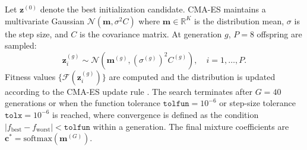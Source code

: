 \documentclass[preprint,12pt]{elsarticle}
\begin{document}
Let $\mathbf{z}^{(0)}$ denote the best initialization candidate. CMA-ES
maintains a multivariate Gaussian $\mathcal{N}(\mathbf{m}, \sigma^2 C)$ where
$\mathbf{m} \in \mathbb{R}^K$ is the distribution mean, $\sigma$ is the step
size, and $C$ is the covariance matrix. At generation $g$, $P = 8$ offspring
are sampled:
\begin{equation}
    \mathbf{z}_i^{(g)} \sim \mathcal{N}(\mathbf{m}^{(g)}, (\sigma^{(g)})^2 C^{(g)}),
    \quad i = 1, \ldots, P.
    \label{eq:cmaes_sample}
\end{equation}
Fitness values $\{\mathcal{F}(\mathbf{z}_i^{(g)})\}$ are computed and the
distribution is updated according to the CMA-ES update rule
\cite{hansen2016cmaes}. The search terminates after $G = 40$ generations or
when the function tolerance $\texttt{tolfun} = 10^{-6}$ or step-size tolerance
$\texttt{tolx} = 10^{-6}$ is reached, where convergence is defined as the
condition $|f_{\text{best}} - f_{\text{worst}}| < \texttt{tolfun}$ within a
generation. The final mixture coefficients are
$\mathbf{c}^* = \mathrm{softmax}(\mathbf{m}^{(G)})$.
\end{document}
